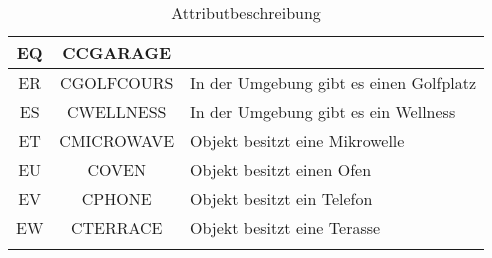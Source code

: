 \begin{longtable}{ | c | c | L{10cm} |}
	EQ & CCGARAGE &  \\ \hline 
	ER & CGOLFCOURS & In der Umgebung gibt es einen Golfplatz \\ \hline 
	ES & CWELLNESS & In der Umgebung gibt es ein Wellness \\ \hline 
	ET & CMICROWAVE & Objekt besitzt eine Mikrowelle \\ \hline 
	EU & COVEN & Objekt besitzt einen Ofen \\ \hline 
	EV & CPHONE & Objekt besitzt ein Telefon \\ \hline 
	EW & CTERRACE & Objekt besitzt eine Terasse \\ \hline 
	\caption{Attributbeschreibung}
\end{longtable} 

											